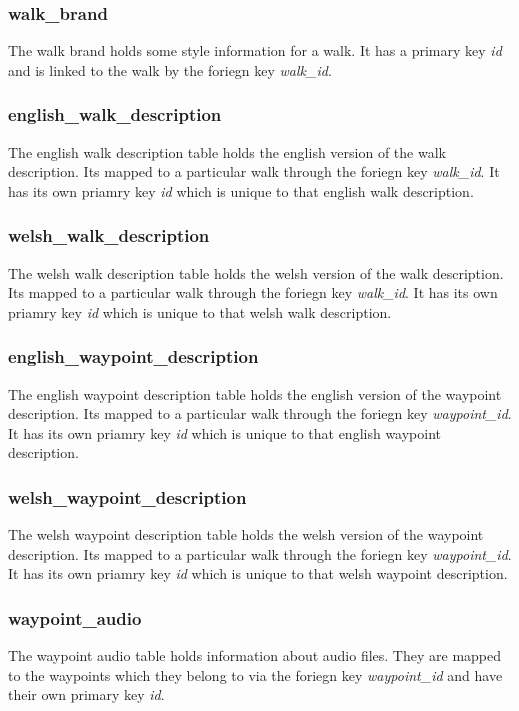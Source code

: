 \documentclass[11pt,a4paper]{report}
\begin{document}
\subsubsection{walk\_brand}
The walk brand holds some style information for a walk. It has a primary key \textit{id} and is linked to the walk by the foriegn key \textit{walk\_id}. 

\subsubsection{english\_walk\_description}
The english walk description table holds the english version of the walk description. Its mapped to a particular walk through the foriegn key \textit{walk\_id}. It has its own priamry key \textit{id} which is unique to that english walk description. 

\subsubsection{welsh\_walk\_description}
The welsh walk description table holds the welsh version of the walk description. Its mapped to a particular walk through the foriegn key \textit{walk\_id}. It has its own priamry key \textit{id} which is unique to that welsh walk description. 

\subsubsection{english\_waypoint\_description}
The english waypoint description table holds the english version of the waypoint description. Its mapped to a particular walk through the foriegn key \textit{waypoint\_id}. It has its own priamry key \textit{id} which is unique to that english waypoint description. 

\subsubsection{welsh\_waypoint\_description}
The welsh waypoint description table holds the welsh version of the waypoint description. Its mapped to a particular walk through the foriegn key \textit{waypoint\_id}. It has its own priamry key \textit{id} which is unique to that welsh waypoint description. 

\subsubsection{waypoint\_audio}
The waypoint audio table holds information about audio files. They are mapped to the waypoints which they belong to via the foriegn key \textit{waypoint\_id} and have their own primary key \textit{id}.
\end{document}

